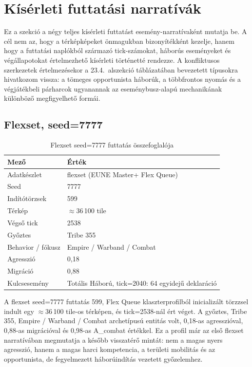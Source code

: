 \section{Kísérleti futtatási narratívák}
\label{sec:neurosim-26-runs}

Ez a szekció a négy teljes kísérleti futtatást esemény-narratívaként mutatja be. A cél nem az, hogy a térképképeket önmagukban bizonyítékként kezelje, hanem hogy a futtatási naplókból származó tick-számokat, háborús eseményeket és végállapotokat értelmezhető kísérleti történetté rendezze. A konfliktusos szerkezetek értelmezésekor a 23.4.~alszekció táblázatában bevezetett típusokra hivatkozom vissza: a tömeges opportunista háborúk, a többfrontos nyomás és a végjátékbeli párharcok ugyanannak az eseménybusz-alapú mechanikának különböző megfigyelhető formái.

\subsection*{Flexset, seed=7777}

\begin{table}[h]
\centering
\caption{Flexset seed=7777 futtatás összefoglalója}
\label{tab:neurosim-run-fl7777-summary}
\begin{tabular}{ll}
\hline
\textbf{Mező} & \textbf{Érték} \\
\hline
Adatkészlet & flexset (EUNE Master+ Flex Queue) \\
Seed & 7777 \\
Indítótörzsek & 599 \\
Térkép & $\approx$36\,100 tile \\
Végső tick & 2538 \\
Győztes & Tribe 355 \\
Behavior / fókusz & Empire / Warband / Combat \\
Agresszió & 0,18 \\
Migráció & 0,88 \\
Kulcsesemény & Totális Háború, tick=2040: 64 egyidejű deklaráció \\
\hline
\end{tabular}
\end{table}

A flexset seed=7777 futtatás 599, Flex Queue klaszterprofilból inicializált törzzsel indult egy $\approx$36\,100 tile-os térképen, és tick=2538-nál ért véget. A győztes, Tribe 355, Empire / Warband / Combat archetípusú entitás volt, 0,18-as agresszióval, 0,88-as migrációval és 0,98-as A\_combat értékkel. Ez a profil már az első flexset narratívában megmutatja a később visszatérő mintát: nem a magas nyers agresszió, hanem a magas harci kompetencia, a területi mobilitás és az opportunista, de fegyelmezett háborúindítás vezetett győzelemhez.

